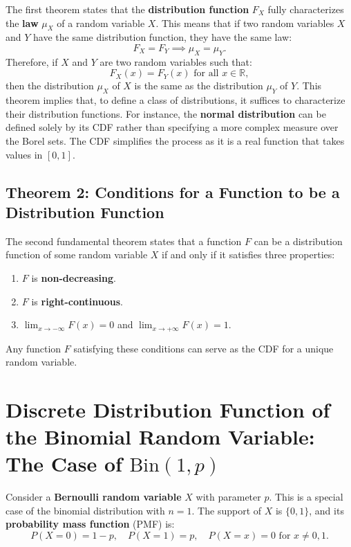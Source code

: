     The first theorem states that the \textbf{distribution function} \( F_X \) fully characterizes the \textbf{law} \( \mu_X \) of a random variable \( X \). This means that if two random variables \( X \) and \( Y \) have the same distribution function, they have the same law:
    \[
    F_X = F_Y \implies \mu_X = \mu_Y.
    \]
    Therefore, if \( X \) and \( Y \) are two random variables such that:
    \[
    F_X(x) = F_Y(x) \text{ for all } x \in \mathbb{R},
    \]
    then the distribution \( \mu_X \) of \( X \) is the same as the distribution \( \mu_Y \) of \( Y \). \newline
    This theorem implies that, to define a class of distributions, it suffices to characterize their distribution functions. For instance, the \textbf{normal distribution} can be defined solely by its CDF rather than specifying a more complex measure over the Borel sets. The CDF simplifies the process as it is a real function that takes values in \([0,1]\).
    
    \subsection{Theorem 2: Conditions for a Function to be a Distribution Function}
    
    The second fundamental theorem states that a function \( F \) can be a distribution function of some random variable \( X \) if and only if it satisfies three properties:
    \begin{enumerate}
        \item \( F \) is \textbf{non-decreasing}.
        \item \( F \) is \textbf{right-continuous}.
        \item \(\lim_{x \to -\infty} F(x) = 0\) and \(\lim_{x \to +\infty} F(x) = 1\).
    \end{enumerate}
    Any function \( F \) satisfying these conditions can serve as the CDF for a unique random variable.
    
    \section{Discrete Distribution Function of the Binomial Random Variable: The Case of \( \text{Bin}(1, p) \)}
    Consider a \textbf{Bernoulli random variable} \( X \) with parameter \( p \). This is a special case of the binomial distribution with \( n = 1 \). The support of \( X \) is \( \{0, 1\} \), and its \textbf{probability mass function} (PMF) is:
    \[
    P(X = 0) = 1 - p, \quad P(X = 1) = p, \quad P(X = x) = 0 \text{ for } x \neq 0, 1.
    \]
    
